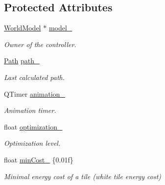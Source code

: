 \subsection*{Protected Attributes}
\begin{DoxyCompactItemize}
\item 
\hyperlink{classWorldModel}{World\+Model} $\ast$ \hyperlink{classWorldAbstractController_a45fe9595cbcc1eafe6f3f418a08f46c4}{model\+\_\+}\hypertarget{classWorldAbstractController_a45fe9595cbcc1eafe6f3f418a08f46c4}{}\label{classWorldAbstractController_a45fe9595cbcc1eafe6f3f418a08f46c4}

\begin{DoxyCompactList}\small\item\em Owner of the controller. \end{DoxyCompactList}\item 
\hyperlink{structPath}{Path} \hyperlink{classWorldAbstractController_a8e42846e0e46245149339a79758c8a4b}{path\+\_\+}\hypertarget{classWorldAbstractController_a8e42846e0e46245149339a79758c8a4b}{}\label{classWorldAbstractController_a8e42846e0e46245149339a79758c8a4b}

\begin{DoxyCompactList}\small\item\em Last calculated path. \end{DoxyCompactList}\item 
Q\+Timer \hyperlink{classWorldAbstractController_ad152162c39be7f44e48f5ab2de7fcafa}{animation\+\_\+}\hypertarget{classWorldAbstractController_ad152162c39be7f44e48f5ab2de7fcafa}{}\label{classWorldAbstractController_ad152162c39be7f44e48f5ab2de7fcafa}

\begin{DoxyCompactList}\small\item\em Animation timer. \end{DoxyCompactList}\item 
float \hyperlink{classWorldAbstractController_abaf4fb0106d4f5ee475b609a1b3116dd}{optimization\+\_\+}\hypertarget{classWorldAbstractController_abaf4fb0106d4f5ee475b609a1b3116dd}{}\label{classWorldAbstractController_abaf4fb0106d4f5ee475b609a1b3116dd}

\begin{DoxyCompactList}\small\item\em Optimization level. \end{DoxyCompactList}\item 
float \hyperlink{classWorldAbstractController_ad6c2ffd420b9c691d372a8232ab128cc}{min\+Cost\+\_\+} \{0.\+01f\}
\begin{DoxyCompactList}\small\item\em Minimal energy cost of a tile (white tile energy cost) \end{DoxyCompactList}\end{DoxyCompactItemize}


